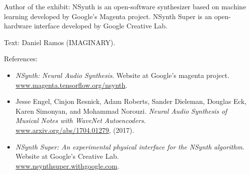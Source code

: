 \begin{sectcredits}

\item[Author of the exhibit:] NSynth is an open-software synthesizer based on machine learning developed by Google's Magenta project. NSynth Super is an open-hardware interface developed by Google Creative Lab.

\item[Text:] Daniel Ramos (IMAGINARY).

\item[References:] \strut
\noindent \begin{itemize}[leftmargin=*]

\item \emph{NSynth: Neural Audio Synthesis}. Website at Google's magenta project. \\
\url{www.magenta.tensorflow.org/nsynth}.

\item Jesse Engel, Cinjon Resnick, Adam Roberts, Sander Dieleman, Douglas Eck, Karen Simonyan, and Mohammad Norouzi. \emph{Neural Audio Synthesis of Musical Notes with WaveNet Autoencoders.} \\
\url{www.arxiv.org/abs/1704.01279}, (2017).

\item \emph{NSynth Super: An experimental physical interface for the NSynth algorithm.} Website at Google's Creative Lab.\\ \url{www.nsynthsuper.withgoogle.com}.
\end{itemize}
\end{sectcredits}
